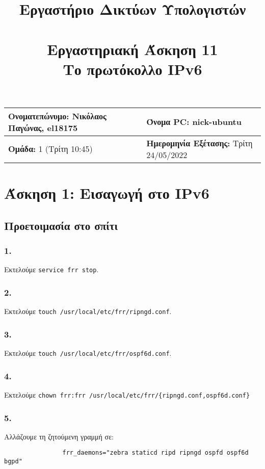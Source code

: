 \documentclass[a4paper, 12pt]{article}
\title{
	\textbf{Εργαστήριο Δικτύων Υπολογιστών} \\~\\
	Εργαστηριακή Άσκηση 11 \\ 
	Το πρωτόκολλο IPv6
}
\author{}
\date{}
\begin{document}
\maketitle
\begin{center}
	\begin{tabular}{|l|l|}
		\hline
		\textbf{Ονοματεπώνυμο:} Νικόλαος Παγώνας, el18175  & \textbf{Όνομα PC:} nick-ubuntu \\
		\hline
		\textbf{Ομάδα:} 1 (Τρίτη 10:45) & \textbf{Ημερομηνία Εξέτασης:} Τρίτη 24/05/2022 \\
		\hline
	\end{tabular}
\end{center}

\section*{Άσκηση 1: Εισαγωγή στο IPv6}

	\subsection*{Προετοιμασία στο σπίτι}

		\subsubsection*{1.}
			Εκτελούμε \verb|service frr stop|.

		\subsubsection*{2.}
			Εκτελούμε \verb|touch /usr/local/etc/frr/ripngd.conf|.

		\subsubsection*{3.}
			Εκτελούμε \verb|touch /usr/local/etc/frr/ospf6d.conf|.

		\subsubsection*{4.}
			Εκτελούμε \verb|chown frr:frr /usr/local/etc/frr/{ripngd.conf,ospf6d.conf}|
		
		\subsubsection*{5.}
			Αλλάζουμε τη ζητούμενη γραμμή σε:
			
			\begin{verbatim}
				frr_daemons="zebra staticd ripd ripngd ospfd ospf6d bgpd"
			\end{verbatim}
\end{document}

